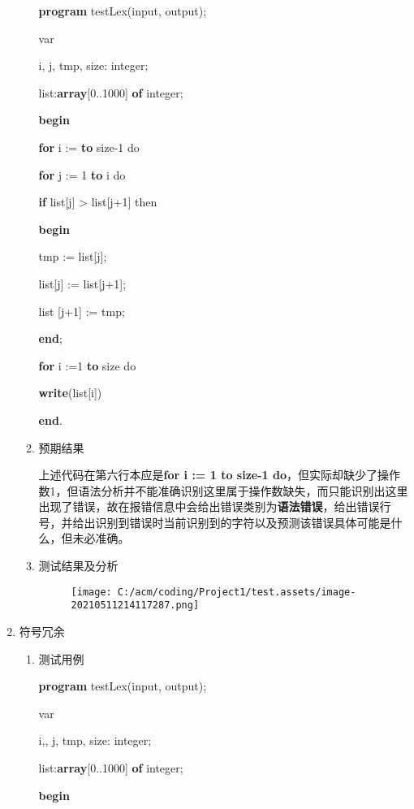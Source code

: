 \documentclass[]{ctexart}
\newenvironment{Shaded}{}{}
\newcommand{\DataTypeTok}[1]{\textcolor[rgb]{0.56,0.13,0.00}{#1}}
\newcommand{\DecValTok}[1]{\textcolor[rgb]{0.25,0.63,0.44}{#1}}
\newcommand{\KeywordTok}[1]{\textcolor[rgb]{0.00,0.44,0.13}{\textbf{#1}}}
\newcommand{\NormalTok}[1]{#1}
\begin{document}
\begin{enumerate}
\begin{enumerate}
\begin{Shaded}
\begin{Highlighting}[]
\KeywordTok{program}\NormalTok{ testLex(input, output);
}
\NormalTok{var
}
\NormalTok{	i, j, tmp, size: }\DataTypeTok{integer}\NormalTok{;
}
\NormalTok{	list:}\KeywordTok{array}\NormalTok{[}\DecValTok{0}\NormalTok{..}\DecValTok{1000}\NormalTok{] }\KeywordTok{of} \DataTypeTok{integer}\NormalTok{;
}
\KeywordTok{begin}

    \KeywordTok{for}\NormalTok{ i := }\KeywordTok{to}\NormalTok{ size}\DecValTok{-1}\NormalTok{ do
}
	\KeywordTok{for}\NormalTok{ j := }\DecValTok{1} \KeywordTok{to}\NormalTok{ i do
}
	    \KeywordTok{if}\NormalTok{ list[j] > list[j+}\DecValTok{1}\NormalTok{] then
}
	    \KeywordTok{begin}

\NormalTok{		    tmp := list[j];
}
\NormalTok{		    list[j] := list[j+}\DecValTok{1}\NormalTok{];
}
\NormalTok{		    list [j+}\DecValTok{1}\NormalTok{] := tmp;
}
	    \KeywordTok{end}\NormalTok{;
}


    \KeywordTok{for}\NormalTok{ i :=}\DecValTok{1} \KeywordTok{to}\NormalTok{ size do
}
	\KeywordTok{write}\NormalTok{(list[i])
}
\KeywordTok{end}\NormalTok{.}
\end{Highlighting}
\end{Shaded}
  \item
    预期结果

    上述代码在第六行本应是\textbf{for i := 1 to size-1
    do}，但实际却缺少了操作数1，但语法分析并不能准确识别这里属于操作数缺失，而只能识别出这里出现了错误，故在报错信息中会给出错误类别为\textbf{语法错误}，给出错误行号，并给出识别到错误时当前识别到的字符以及预测该错误具体可能是什么，但未必准确。
  \item
    测试结果及分析

    \begin{figure}
    \centering
    \texttt{[image: C:/acm/coding/Project1/test.assets/image-20210511214117287.png]}
    \caption{}
    \end{figure}
  \end{enumerate}
\item
  符号冗余

  \begin{enumerate}
  \def\labelenumii{\arabic{enumii}.}
  \item
    测试用例

\begin{Shaded}
\begin{Highlighting}[]
\KeywordTok{program}\NormalTok{ testLex(input, output);
}
\NormalTok{var
}
\NormalTok{	i,, j, tmp, size: }\DataTypeTok{integer}\NormalTok{;
}
\NormalTok{	list:}\KeywordTok{array}\NormalTok{[}\DecValTok{0}\NormalTok{..}\DecValTok{1000}\NormalTok{] }\KeywordTok{of} \DataTypeTok{integer}\NormalTok{;
}
\KeywordTok{begin}


\end{Highlighting}
\end{Shaded}
\end{enumerate}
\end{enumerate}
\end{document}
